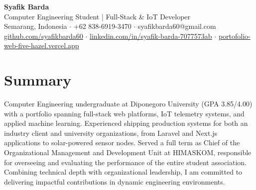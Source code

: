 \documentclass[a4paper,10pt]{article}
\begin{document}
\begin{center}
{\LARGE\bfseries Syafik Barda}\\[0.35em]
{\small Computer Engineering Student | Full-Stack \& IoT Developer}\\[0.25em]
{\small Semarang, Indonesia $\cdot$ +62 838-6919-3470 $\cdot$ syafikbarda60@gmail.com}\\[0.25em]
{\small \href{https://github.com/syafikbarda60}{github.com/syafikbarda60} $\cdot$ \href{https://www.linkedin.com/in/syafik-barda-7077573ab/}{linkedin.com/in/syafik-barda-7077573ab} $\cdot$ \href{https://portofolio-web-five-hazel.vercel.app/}{portofolio-web-five-hazel.vercel.app}}
\end{center}

\section{Summary}
Computer Engineering undergraduate at Diponegoro University (GPA 3.85/4.00) with a portfolio spanning full-stack web platforms, IoT telemetry systems, and applied machine learning. Experienced shipping production systems for both an industry client and university organizations, from Laravel and Next.js applications to solar-powered sensor nodes. Served a full term as Chief of the Organizational Management and Development Unit at HIMASKOM, responsible for overseeing and evaluating the performance of the entire student association. Combining technical depth with organizational leadership, I am committed to delivering impactful contributions in dynamic engineering environments.
\end{document}
